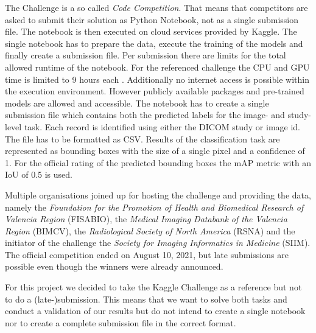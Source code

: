 The Challenge is a so called \textit{Code Competition}. That means that competitors are asked to submit their solution as Python Notebook, not as a single submission file. The notebook is then executed on cloud services provided by Kaggle. The single notebook has to prepare the data, execute the training of the models and finally create a submission file. Per submission there are limits for the total allowed runtime of the notebook. For the referenced challenge the CPU and GPU time is limited to 9 hours each \autocite{SIIMKaggle}. Additionally no internet access is possible within the execution environment. However publicly available packages and pre-trained models are allowed and accessible. The notebook has to create a single submission file which contains both the predicted labels for the image- and study-level task. Each record is identified using either the DICOM study or image id. The file has to be formatted as CSV. Results of the classification task are represented as bounding boxes with the size of a single pixel and a confidence of 1. For the official rating of the predicted bounding boxes the \ac{mAP} metric with an \ac{IoU} of \num{0.5} is used.

Multiple organisations joined up for hosting the challenge and providing the data, namely the \textit{Foundation for the Promotion of Health and Biomedical Research of Valencia Region} (FISABIO), the \textit{Medical Imaging Databank of the Valencia Region} (BIMCV), the \textit{Radiological Society of North America} (RSNA) and the initiator of the challenge the \textit{Society for Imaging Informatics in Medicine} (SIIM). The official competition ended on August 10, 2021, but late submissions are possible even though the winners were already announced.

For this project we decided to take the Kaggle Challenge as a reference but not to do a (late-)submission. This means that we want to solve both tasks and conduct a validation of our results but do not intend to create a single notebook nor to create a complete submission file in the correct format. 


